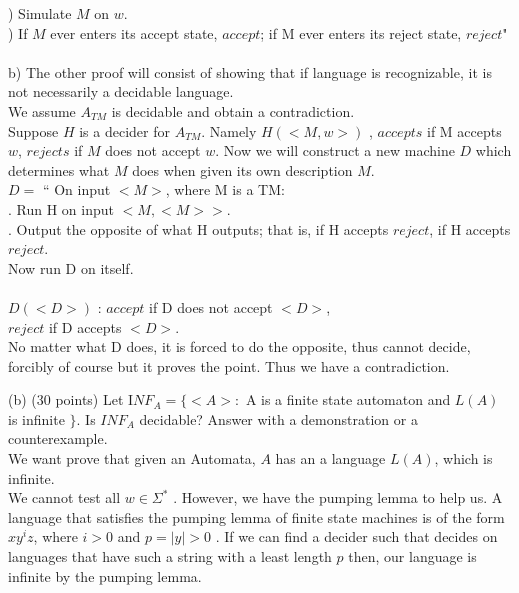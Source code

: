 \documentclass{report}
\newcommand{\me}[1]{
\begin{math}
#1
\end{math}
}
\begin{document}
   ) Simulate $M$ on $w$.\\
   ) If $M$ ever enters its accept state, $accept$; if M ever enters its reject state, \indent \indent$reject$" \\ \\
b) The other proof will consist of showing that if language is recognizable, it is not necessarily a decidable language. \\ 
\indent We assume $A_{TM}$ is decidable and obtain a contradiction. \\ 
Suppose $H$ is a decider for $A_{TM}$. Namely \me{H(<M,w>)}, $accepts$ if M accepts $w$, $rejects$ if $M$ does not accept $w$. Now we will construct a new machine $D$ which determines what $M$ does when given its own description $M$. \\
\indent \me{D =} `` On input $<M>$, where M is a TM: \\
\indent {}. Run H on input $<M,<M>>$. \\
\indent {}. Output the opposite of what H outputs; that is, if H accepts $reject$, \indent \indent  if H accepts $reject$.\\ Now run D on itself. \\ \\

\me{D(<D>)}: $accept$ if D does not accept $<D>$, \\ \indent \indent \indent \indent \indent$reject$ if D accepts $<D>$. \\
No matter what D does, it is forced to do the opposite, thus cannot decide, forcibly of course but it proves the point. Thus we have a contradiction. 

\newpage

(b) (30 points)  Let I$NF_A =  \{<A>: $ A is a finite state automaton and \me{L(A)} is infinite $\} $. Is $INF_A$ decidable? Answer with a demonstration or a counterexample. \\


We want prove that given  an Automata, $A$ has an a language $L(A)$, which is infinite. \\ We cannot test all \me{w \in \Sigma^*}. However, we have the pumping lemma to help us. A language that satisfies the pumping lemma of finite state machines is of the form $xy^iz$, where \me{i >0} and \me{p=|y|>0}. If we can find a decider such that decides on languages that have such a string with a least length $p$ then, our language is infinite by the pumping lemma. \\ \\
 
\end{document}

